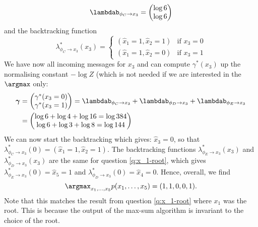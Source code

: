 \begin{exenumerate}
\begin{solution}
\begin{equation}
         \lambdab_{\phi_C \to x_3} = \begin{pmatrix}
           \log 6\\
           \log 6
         \end{pmatrix}
       \end{equation}
       and the backtracking function
       \begin{equation}
         \lambda^*_{\phi_C \to x_3}(x_3) = \begin{cases}
           (\hat{x}_1=1, \hat{x}_2=1) & \text{if } x_3=0\\
           (\hat{x}_1=1, \hat{x}_2=0) & \text{if } x_3=1
         \end{cases}
       \end{equation}
       We have now all incoming messages for $x_3$ and can compute
       $\gamma^*(x_3)$ up the normalising constant $-\log Z$ (which is
       not needed if we are interested in the $\argmax$ only:
       \begin{align}
         \boldsymbol{\gamma}&=\begin{pmatrix}
         \gamma^*(x_3=0) \\
         \gamma^*(x_3=1)
         \end{pmatrix}
         =  \lambdab_{\phi_C \to x_3} +  \lambdab_{\phi_D \to x_3} +  \lambdab_{\phi_E \to x_3}\\
         & = \begin{pmatrix}
           \log 6 + \log 4 + \log 16 = \log 384 \\
           \log 6 + \log 3 + \log 8 = \log 144
         \end{pmatrix}
       \end{align}
       We can now start the backtracking which gives: $\hat{x}_3 = 0$,
       so that $\lambda^*_{\phi_C \to x_3}(0) = (\hat{x}_1=1,
       \hat{x}_2=1)$. The backtracking functions $\lambda^*_{\phi_E
         \to x_3}(x_3)$ and $\lambda^*_{\phi_D \to x_3}(x_3)$ are the
       same for question \ref{q:x_1-root}, which gives
       $\lambda^*_{\phi_E \to x_3}(0) = \hat{x}_5=1$ and
       $\lambda^*_{\phi_D \to x_3}(0) = \hat{x}_4=0$. Hence, overall, we
       find
       \begin{equation}
         \argmax_{x_1, \ldots, x_5} p(x_1, \ldots, x_5) = (1, 1, 0, 0, 1).
       \end{equation}
       Note that this matches the result from question
       \ref{q:x_1-root} where $x_1$ was the root. This is because the
       output of the max-sum algorithm is invariant to the choice of
       the root.

    \end{solution}
    
  \end{exenumerate}
  
